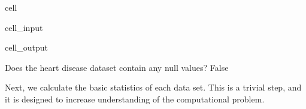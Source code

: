 \documentclass[letterpaper,10pt,english]{jupyterBook}
\begin{document}
\begin{sphinxuseclass}{cell}\begin{sphinxVerbatimInput}

\begin{sphinxuseclass}{cell_input}
\begin{sphinxVerbatim}[commandchars=\\\{\}]
\end{sphinxVerbatim}

\end{sphinxuseclass}\end{sphinxVerbatimInput}
\begin{sphinxVerbatimOutput}

\begin{sphinxuseclass}{cell_output}
\begin{sphinxVerbatim}[commandchars=\\\{\}]
Does the heart disease dataset contain any null values? False
\end{sphinxVerbatim}

\end{sphinxuseclass}\end{sphinxVerbatimOutput}

\end{sphinxuseclass}
\sphinxAtStartPar
Next, we calculate the basic statistics of each data set. This is a trivial step, and it is designed to increase understanding of the computational problem.
\end{document}
